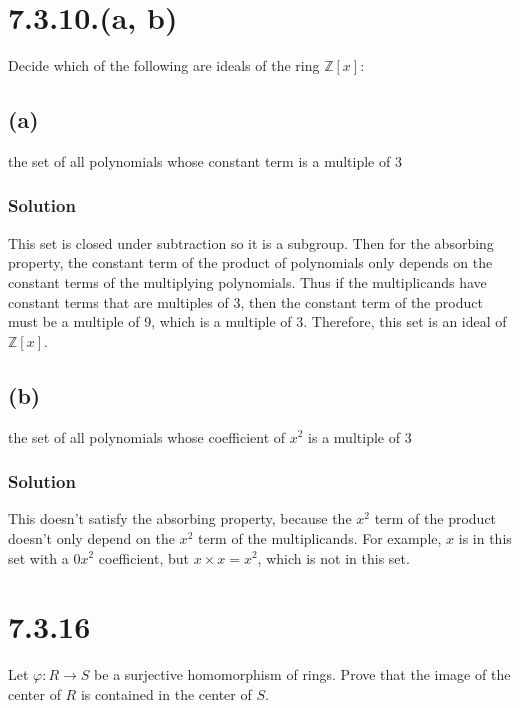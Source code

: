 \documentclass[fleqn]{article}
\begin{document}
    \section{7.3.10.(a, b)}
    Decide which of the following are ideals of the ring $\mathbb{Z}[x]$:
        
        \subsection{(a)}
        the set of all polynomials whose constant term is a multiple of 3
            
            \subsubsection{Solution}
            This set is closed under subtraction so it is a subgroup.  Then for the absorbing property, the constant term of the product of polynomials only depends on the constant terms of the multiplying polynomials.  Thus if the multiplicands have constant terms that are multiples of 3, then the constant term of the product must be a multiple of 9, which is a multiple of 3.  Therefore, this set is an ideal of $\mathbb{Z}[x]$.
        
        \subsection{(b)}
        the set of all polynomials whose coefficient of $x^2$ is a multiple of 3
        
            \subsubsection{Solution}
            This doesn't satisfy the absorbing property, because the $x^2$ term of the product doesn't only depend on the $x^2$ term of the multiplicands.  For example, $x$ is in this set with a $0 x^2$ coefficient, but $x \times x = x^2$, which is not in this set.
    
    \section{7.3.16}
    Let $\varphi: R \to S$ be a surjective homomorphism of rings.  Prove that the image of the center of $R$ is contained in the center of $S$.
        
\end{document}
